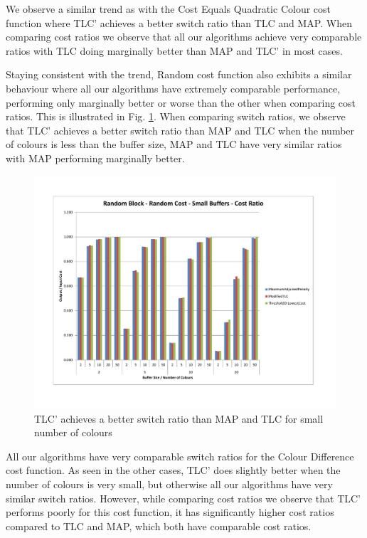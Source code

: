 We observe a similar trend as with the Cost Equals Quadratic Colour cost function where TLC' achieves a better switch ratio than TLC and MAP. When comparing cost ratios we observe that all our algorithms achieve very comparable ratios with TLC doing marginally better than  MAP and TLC' in most cases. 

Staying consistent with the trend, Random cost function also exhibits a similar behaviour where all our algorithms have extremely comparable performance, performing only marginally better or worse than the other when comparing cost ratios. This is illustrated in Fig. \ref{randomBlockRCSmallCost}. When comparing switch ratios, we observe that TLC' achieves a better switch ratio than MAP and TLC when the number of colours is less than the buffer size, MAP and TLC have very similar ratios with MAP performing marginally better. 

\begin{figure}[ht]
\centering 
\includegraphics[scale=0.60]{Random-Block-rc-small-cost.pdf}
\caption{TLC' achieves a better switch ratio than MAP and TLC for small number of colours}
\label{randomBlockRCSmallCost}
\end{figure}   

All our algorithms have very comparable switch ratios for the Colour Difference cost function. As seen in the other cases, TLC' does slightly better when the number of colours is very small, but otherwise all our algorithms have very similar switch ratios. However, while comparing cost ratios we observe that TLC' performs poorly for this cost function, it has significantly higher cost ratios compared to TLC and MAP, which both have comparable cost ratios. 

